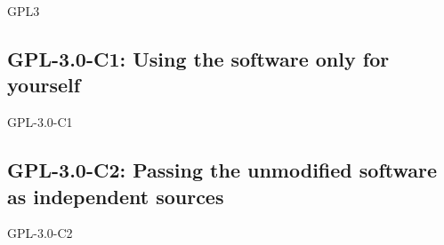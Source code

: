 
\renewcommand{\ver}{3.0}

\begin{license}{GPL3} 

\subsection{GPL-\ver-C1: Using the software only for yourself}
\begin{lsuc}{GPL-\ver-C1}

  \useCaseOne

  \begin{lsucrequiresnothing}
  \end{lsucrequiresnothing}

  \begin{lsucprohibits}
    \lsucitem{\noPatentLitigation}
  \end{lsucprohibits}
\end{lsuc}

\subsection{GPL-\ver-C2: Passing the unmodified software as independent sources}
\begin{lsuc}{GPL-\ver-C2}

  \useCaseTwo

  \begin{lsucrequires}
    \lsucmandatory{\keepLicenseElements}
    \lsucmandatory{\gplthreeEnsureCopyrightNoticeSource}
    \lsucmandatory{\giveLicense}\passingFilesCorrectly
    \lsucmandatory{\retainCopyrightNotices}
    \lsucoptional{\addToDocumentation}
  \end{lsucrequires}

  \begin{lsucprohibits}
    \lsucitem{\noPatentLitigation}
  \end{lsucprohibits}
\end{lsuc}


\end{license}
